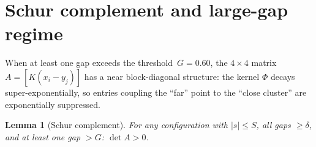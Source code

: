 \documentclass[11pt,a4paper]{amsart}
\newtheorem{lemma}[theorem]{Lemma}
\theoremstyle{definition}
\theoremstyle{remark}
\begin{document}
\section{Schur complement and large-gap regime}\label{sec:schur}

When at least one gap exceeds the threshold~$G = 0.60$,
the $4\times 4$ matrix $A = [K(x_i - y_j)]$ has a near
block-diagonal structure: the kernel $\Phi$ decays
super-exponentially, so entries coupling the ``far'' point
to the ``close cluster'' are exponentially suppressed.

\begin{lemma}[Schur complement]\label{lem:schur}
For any configuration with $|s| \le S$, all gaps $\ge \delta$,
and at least one gap $> G$: $\det A > 0$.
\end{lemma}
\end{document}
